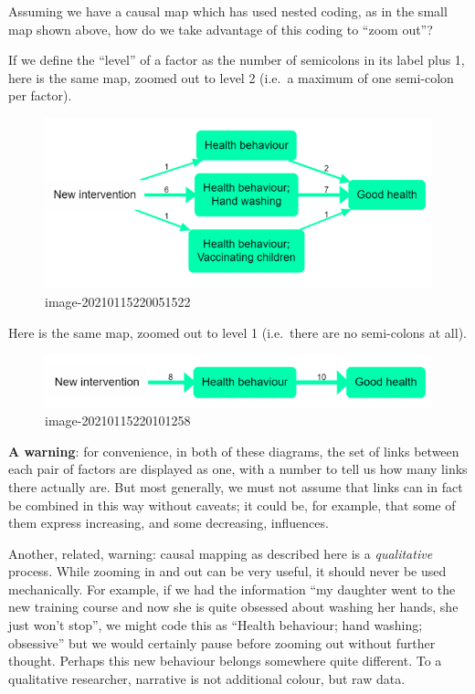 \documentclass[
]{book}
\begin{document}
Assuming we have a causal map which has used nested coding, as in the small map shown above, how do we take advantage of this coding to ``zoom out''?

If we define the ``level'' of a factor as the number of semicolons in its label plus 1, here is the same map, zoomed out to level 2 (i.e.~a maximum of one semi-colon per factor).

\begin{figure}
\centering
\includegraphics[width=6.77083in,height=\textheight]{_assets/image-20210115220051522.png}
\caption{image-20210115220051522}
\end{figure}

Here is the same map, zoomed out to level 1 (i.e.~there are no semi-colons at all).

\begin{figure}
\centering
\includegraphics[width=6.77083in,height=\textheight]{_assets/image-20210115220101258.png}
\caption{image-20210115220101258}
\end{figure}

\textbf{A warning}: for convenience, in both of these diagrams, the set of links between each pair of factors are displayed as one, with a number to tell us how many links there actually are. But most generally, we must not assume that links can in fact be combined in this way without caveats; it could be, for example, that some of them express increasing, and some decreasing, influences.

Another, related, warning: causal mapping as described here is a \emph{qualitative} process. While zooming in and out can be very useful, it should never be used mechanically. For example, if we had the information ``my daughter went to the new training course and now she is quite obsessed about washing her hands, she just won't stop'', we might code this as ``Health behaviour; hand washing; obsessive'' but we would certainly pause before zooming out without further thought. Perhaps this new behaviour belongs somewhere quite different. To a qualitative researcher, narrative is not additional colour, but raw data.
\end{document}

